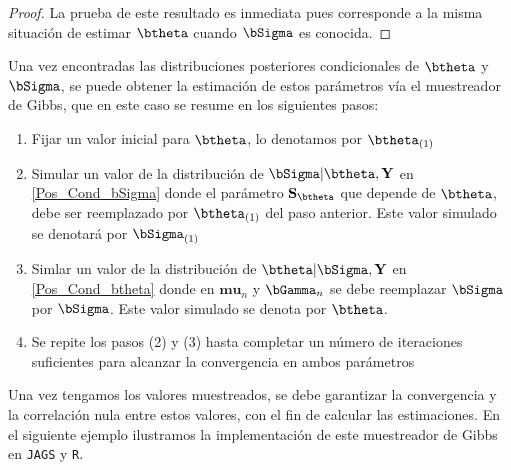 \documentclass[10pt,openright]{book}\usepackage[]{graphicx}\usepackage[]{color}
\begin{document}
\begin{proof}
La prueba de este resultado es inmediata pues corresponde a la misma situaci\'on de estimar $\btheta$ cuando $\bSigma$ es conocida. 
\end{proof}

Una vez encontradas las distribuciones posteriores condicionales de $\btheta$ y $\bSigma$, se puede obtener la estimaci\'on de estos par\'ametros v\'ia el muestreador de Gibbs, que en este caso se resume en los siguientes pasos:
\begin{enumerate}[(1)]
\item Fijar un valor inicial para $\btheta$, lo denotamos por $\btheta_{(1)}$
\item Simular un valor de la distribuci\'on de $\bSigma|\btheta,\mathbf{Y}$ en \ref{Pos_Cond_bSigma} donde el par\'ametro $\mathbf{S_\mathbf{\btheta}}$ que depende de $\btheta$, debe ser reemplazado por $\btheta_{(1)}$ del paso anterior. Este valor simulado se denotar\'a por $\bSigma_{(1)}$
\item  Simlar un valor de la distribuci\'on de $\btheta|\bSigma,\mathbf{Y}$ en \ref{Pos_Cond_btheta} donde en $\mathbf{mu}_n$ y $\bGamma_n$ se debe reemplazar $\bSigma$ por $\bSigma$. Este valor simulado se denota por $\btheta$.
\item Se repite los pasos (2) y (3) hasta completar un n\'umero de iteraciones suficientes para alcanzar la convergencia en ambos par\'ametros
\end{enumerate}
Una vez tengamos los valores muestreados, se debe garantizar la convergencia y la correlaci\'on nula entre estos valores, con el fin de calcular las estimaciones. En el siguiente ejemplo ilustramos la implementaci\'on de este muestreador de Gibbs en \verb'JAGS' y \verb'R'.
\end{document}
